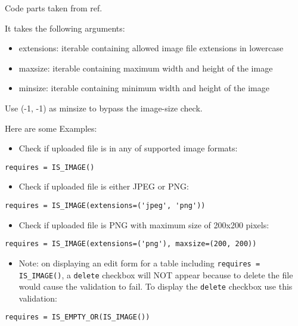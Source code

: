 \documentclass[justified,sixbynine,notoc]{tufte-book}
\def\ft{\small\tt}
\begin{document}
\begin{fullwidth}
Code parts taken from ref.~\cite{source1}

It takes the following arguments:
\begin{itemize}
\item extensions: iterable containing allowed image file extensions in lowercase

\item maxsize: iterable containing maximum width and height of the image

\item minsize: iterable containing minimum width and height of the image
\end{itemize}

Use (-1, -1) as minsize to bypass the image-size check.

Here are some Examples:
\begin{itemize}
\item Check if uploaded file is in any of supported image formats:
\end{itemize}
\begin{lstlisting}
requires = IS_IMAGE()
\end{lstlisting}
\begin{itemize}
\item Check if uploaded file is either JPEG or PNG:
\end{itemize}
\begin{lstlisting}
requires = IS_IMAGE(extensions=('jpeg', 'png'))
\end{lstlisting}

\begin{itemize}
\item Check if uploaded file is PNG with maximum size of 200x200 pixels:
\end{itemize}
\begin{lstlisting}
requires = IS_IMAGE(extensions=('png'), maxsize=(200, 200))
\end{lstlisting}

\begin{itemize}
\item Note: on displaying an edit form for a table including {\ft requires = IS\_IMAGE()}, a {\ft delete} checkbox will NOT appear because to delete the file would cause the validation to fail. To display the {\ft delete} checkbox use this validation:
\end{itemize}
\begin{lstlisting}
requires = IS_EMPTY_OR(IS_IMAGE())
\end{lstlisting}


\end{fullwidth}
\end{document}
